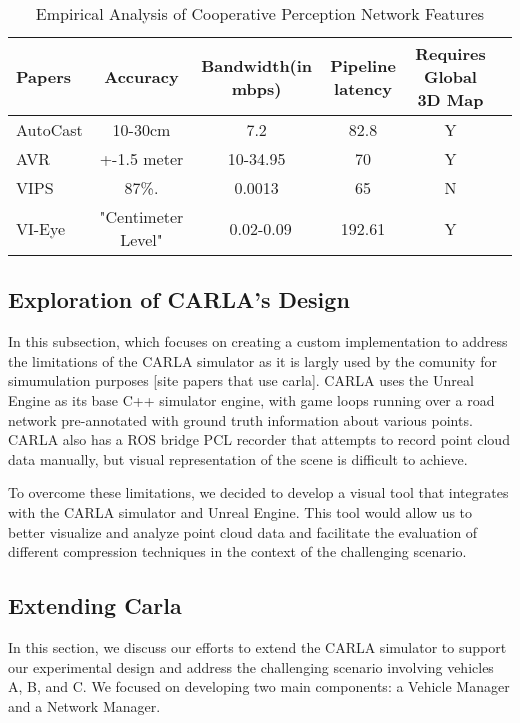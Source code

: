 \documentclass[conference]{IEEEtran}
\begin{document}
\begin{table*}[htbp]
    \centering
    \caption{Empirical Analysis of Cooperative Perception Network Features}
    \label{tab:empirical_analysis}
    \begin{tabular}{@{}lccccc@{}}
    \toprule
    Papers & Accuracy & Bandwidth(in mbps) & Pipeline latency & Requires Global 3D Map \\ \midrule
    AutoCast & 10-30cm & 7.2 & 82.8 & Y  \\
    AVR & +-1.5 meter & 10-34.95 & 70 & Y  \\
    VIPS  & 87\%. & 0.0013 & 65 & N  \\
    VI-Eye & "Centimeter Level" & ~0.02-0.09 & 192.61 & Y  \\
    \bottomrule
    \end{tabular}
    \end{table*}

\subsection{Exploration of CARLA's Design}

In this subsection, which focuses on creating a custom implementation to address the limitations of the CARLA simulator as it is largly used by the comunity for simumulation purposes [site papers that use carla]. CARLA uses the Unreal Engine as its base C++ simulator engine, with game loops running over a road network pre-annotated with ground truth information about various points. CARLA also has a ROS bridge PCL recorder that attempts to record point cloud data manually, but visual representation of the scene is difficult to achieve.

To overcome these limitations, we decided to develop a visual tool that integrates with the CARLA simulator and Unreal Engine. This tool would allow us to better visualize and analyze point cloud data and facilitate the evaluation of different compression techniques in the context of the challenging scenario.

\subsection{Extending Carla}
In this section, we discuss our efforts to extend the CARLA simulator to support our experimental design and address the challenging scenario involving vehicles A, B, and C. We focused on developing two main components: a Vehicle Manager and a Network Manager.
\end{document}
